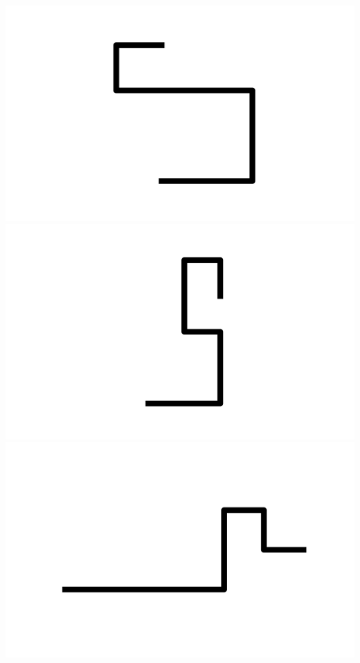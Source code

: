 \documentclass[]{report}
\begin{document}
\includegraphics[scale=.1]{pictures/21/state_cluster_shapes_13.pdf} 
\includegraphics[scale=.1]{pictures/21/state_cluster_shapes_14.pdf} 
\includegraphics[scale=.1]{pictures/21/state_cluster_shapes_15.pdf} 
\end{document}
